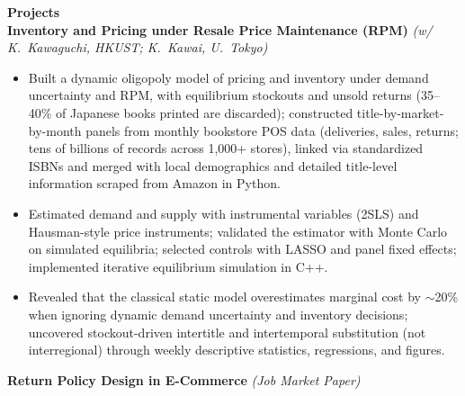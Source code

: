\documentclass[11pt,letterpaper]{article}
\begin{document}
{\large \textbf{Projects}}\\[-0.5pt]
\textbf{Inventory and Pricing under Resale Price Maintenance (RPM)} \textit{(w/ K.\ Kawaguchi, HKUST; K.\ Kawai, U.\ Tokyo)}\\
\vspace{-6pt}
\begin{itemize}
  \item Built a dynamic oligopoly model of pricing and inventory under demand uncertainty and RPM, with equilibrium stockouts and unsold returns (35--40\% of Japanese books printed are discarded); constructed title-by-market-by-month panels from monthly bookstore POS data (deliveries, sales, returns; tens of billions of records across 1{,}000+ stores), linked via standardized ISBNs and merged with local demographics and detailed title-level information scraped from Amazon in Python.
  \item Estimated demand and supply with instrumental variables (2SLS) and Hausman-style price instruments; validated the estimator with Monte Carlo on simulated equilibria; selected controls with LASSO and panel fixed effects; implemented iterative equilibrium simulation in C++.
  \item Revealed that the classical static model overestimates marginal cost by \(\sim\)20\% when ignoring dynamic demand uncertainty and inventory decisions; uncovered stockout-driven intertitle and intertemporal substitution (not interregional) through weekly descriptive statistics, regressions, and figures.
\end{itemize}
\vspace{-3pt}
\textbf{Return Policy Design in E-Commerce} \textit{(Job Market Paper)}\\
\vspace{-6pt}
\end{document}
